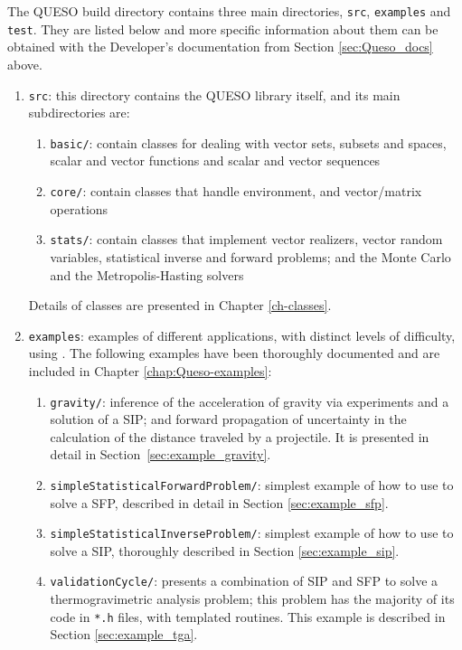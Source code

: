 The QUESO build directory contains three main directories, \texttt{src}, \texttt{examples} and \texttt{test}. They are listed below and more specific
information about them can be obtained with the Developer's documentation from Section \ref{sec:Queso_docs} above.
\begin{enumerate}
\item \texttt{src}: this directory contains the QUESO library itself, and its main subdirectories are:
  \begin{enumerate}
  \item \texttt{basic/}: contain classes for dealing with vector sets, subsets and spaces, scalar and vector functions and scalar and vector sequences
  \item \texttt{core/}: contain classes that handle \Queso{} environment, and vector/matrix operations
  \item \texttt{stats/}: contain classes that implement vector realizers, vector random variables, statistical inverse and forward problems; and the Monte Carlo and the Metropolis-Hasting solvers
  \end{enumerate}

Details of \Queso{}  classes are presented in Chapter \ref{ch-classes}.

\item \texttt{examples}:  examples of different applications, with distinct levels of difficulty, using \Queso{}. The following examples have been thoroughly documented and are included in Chapter \ref{chap:Queso-examples}:
\begin{enumerate}
\item \texttt{gravity/}: inference of the acceleration of gravity via experiments and a solution of a SIP; and forward propagation of uncertainty in the calculation of the distance traveled by a projectile. It is presented in detail in Section~\ref{sec:example_gravity}.


\item \texttt{simpleStatisticalForwardProblem/}: simplest example of how to use \Queso{} to solve a SFP, described in detail in Section \ref{sec:example_sfp}.

\item \texttt{simpleStatisticalInverseProblem/}: simplest example of how to use \Queso{} to solve a SIP, thoroughly described in Section \ref{sec:example_sip}.

\item \texttt{validationCycle/}: presents a combination of SIP and SFP to solve a thermogravimetric analysis problem; this problem has the majority of its code in \verb+*.h+ files, with templated routines. This example is described in Section \ref{sec:example_tga}.


\end{enumerate}
\end{enumerate}
